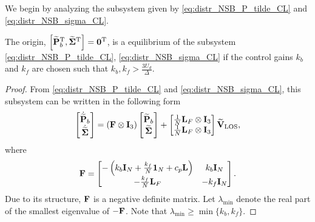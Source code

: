 We begin by analyzing the subsystem given by \eqref{eq:distr_NSB_P_tilde_CL} and \eqref{eq:distr_NSB_sigma_CL}.
\begin{lemma}
    \label{lemma1}
    The origin, $\left[\widetilde{\mathbf{P}}_b^{\mathrm{T}}, \widetilde{\bm{\Sigma}}^{\mathrm{T}}\right] = \mathbf{0}^{\mathrm{T}}$, is a  equilibrium of the subsystem \eqref{eq:distr_NSB_P_tilde_CL}, \eqref{eq:distr_NSB_sigma_CL} if  the control gains $k_b$ and $k_f$ are chosen such that $k_b, k_f > \frac{3U_d}{\Delta}$.
\end{lemma}
\begin{proof}        
    From \eqref{eq:distr_NSB_P_tilde_CL} and \eqref{eq:distr_NSB_sigma_CL}, this subsystem can be written in the following form
    \begin{equation}
        \begin{bmatrix}
            \dot{\widetilde{\mathbf{P}}}_{b} \\ \dot{\widetilde{\bm{\Sigma}}}
        \end{bmatrix}
        =
        \left( \mathbf{F} \otimes \mathbf{I}_3 \right)
        \begin{bmatrix}
            {\widetilde{\mathbf{P}}}_{b} \\ {\widetilde{\bm{\Sigma}}}
        \end{bmatrix}
        +
        \begin{bmatrix}
            \frac{1}{N} \mathbf{L}_{F} \otimes \mathbf{I}_3 \\ \frac{1}{N} \mathbf{L}_{F} \otimes \mathbf{I}_3
        \end{bmatrix}
        \widetilde{\mathbf{V}}_{\rm LOS},
        \label{eq:distr_NSB_P_Sigma_subsystem}
    \end{equation}
    where
    \begin{equation}
        \mathbf{F} 
        =             
        \begin{bmatrix}
            -\left(k_b\mathbf{I}_N + \frac{k_f}{N}\mathbf{1}_N + c_p\mathbf{L}\right) & k_b\mathbf{I}_N \\
            -\frac{k_f}{N} \mathbf{L}_{F} & -k_f \mathbf{I}_N
        \end{bmatrix}.
    \end{equation}
    Due to its structure, $\mathbf{F}$ is a negative definite matrix.
    Let $\lambda_{\min}$ denote the real part of the smallest eigenvalue of $-\mathbf{F}$.
    Note that $\lambda_{\min} \geq \min\{k_b, k_f\}$.


\end{proof}
